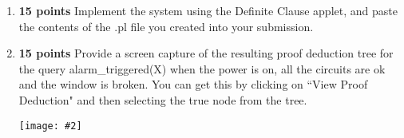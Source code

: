 \documentclass{article}
\newcommand{\centerfig}[2]{\begin{center}\texttt{[image: \#2]}\end{center}}
\begin{document}
\begin{enumerate}[label=(\alph*)]
    \item \textbf{15 points} Implement the system using the Definite Clause applet, and paste the contents of the .pl file you created into your submission.\\
    \begin{center}
         
    \end{center}
    \item \textbf{15 points} Provide a screen capture of the resulting proof deduction tree for the query alarm\_triggered(X) when the power is on, all the circuits are ok and the window is broken. You can get this by clicking on “View Proof Deduction" and then selecting the true node from the tree.\\
    \centerfig{1}{../figs/q4_1.png}
\end{enumerate}
\end{document}
